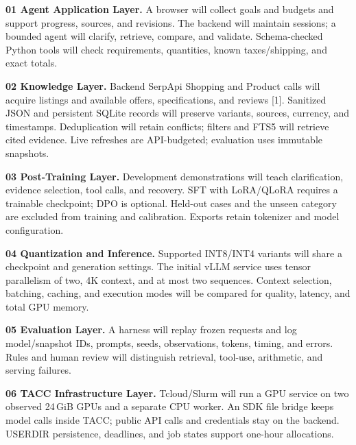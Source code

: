 \documentclass[11pt,letterpaper]{article}
\begin{document}
\textbf{01 Agent Application Layer.} A browser will collect goals and budgets and support progress, sources, and revisions. The backend will maintain sessions; a bounded agent will clarify, retrieve, compare, and validate. Schema-checked Python tools will check requirements, quantities, known taxes/shipping, and exact totals.

\textbf{02 Knowledge Layer.} Backend SerpApi Shopping and Product calls will acquire listings and available offers, specifications, and reviews [1]. Sanitized JSON and persistent SQLite records will preserve variants, sources, currency, and timestamps. Deduplication will retain conflicts; filters and FTS5 will retrieve cited evidence. Live refreshes are API-budgeted; evaluation uses immutable snapshots.

\textbf{03 Post-Training Layer.} Development demonstrations will teach clarification, evidence selection, tool calls, and recovery. SFT with LoRA/QLoRA requires a trainable checkpoint; DPO is optional. Held-out cases and the unseen category are excluded from training and calibration. Exports retain tokenizer and model configuration.

\textbf{04 Quantization and Inference.} Supported INT8/INT4 variants will share a checkpoint and generation settings. The initial vLLM service uses tensor parallelism of two, 4K context, and at most two sequences. Context selection, batching, caching, and execution modes will be compared for quality, latency, and total GPU memory.

\textbf{05 Evaluation Layer.} A harness will replay frozen requests and log model/snapshot IDs, prompts, seeds, observations, tokens, timing, and errors. Rules and human review will distinguish retrieval, tool-use, arithmetic, and serving failures.

\textbf{06 TACC Infrastructure Layer.} Tcloud/Slurm will run a GPU service on two observed 24\,GiB GPUs and a separate CPU worker. An SDK file bridge keeps model calls inside TACC; public API calls and credentials stay on the backend. USERDIR persistence, deadlines, and job states support one-hour allocations.

\newpage
\end{document}
